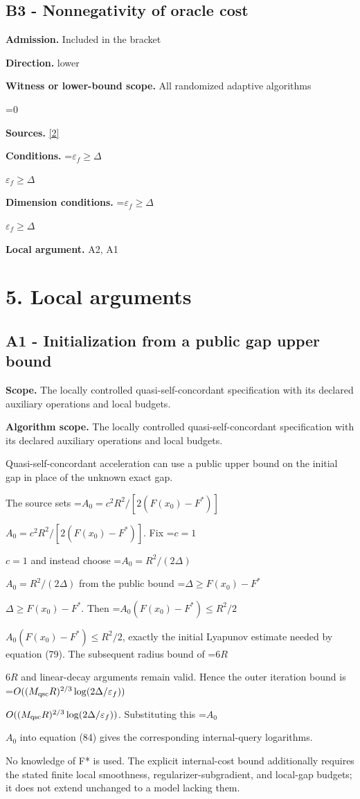 \documentclass[10pt,a4paper]{article}
\newcommand{\AtlasMath}[1]{\par\begingroup\centering\setbox0=\hbox{$\displaystyle #1$}\ifdim\wd0>1.4\linewidth\typeout{ATLAS WIDE FORMULA: \the\wd0}\fi\ifdim\wd0>\linewidth\resizebox{\linewidth}{!}{\box0}\else\box0\fi\par\endgroup}
\newcommand{\AtlasInlineMath}[1]{\begingroup\setbox0=\hbox{$#1$}\ifdim\wd0>.4\linewidth\endgroup\AtlasMath{#1}\else\endgroup$#1$\fi}
\begin{document}
\subsection{B3 - Nonnegativity of oracle cost}
\textbf{Admission.} Included in the bracket

\textbf{Direction.} lower

\textbf{Witness or lower-bound scope.} All randomized adaptive algorithms

\AtlasMath{0}
\textbf{Sources.} \href{https://arxiv.org/html/2610.00345v1}{[2]}

\textbf{Conditions.} \AtlasInlineMath{\varepsilon_f\ge\Delta}

\textbf{Dimension conditions.} \AtlasInlineMath{\varepsilon_f\ge\Delta}

\textbf{Local argument.} A2, A1

\section{5. Local arguments}
\subsection{A1 - Initialization from a public gap upper bound}
\textbf{Scope.} The locally controlled quasi-self-concordant specification with its declared auxiliary operations and local budgets.

\textbf{Algorithm scope.} The locally controlled quasi-self-concordant specification with its declared auxiliary operations and local budgets.

Quasi-self-concordant acceleration can use a public upper bound on the initial gap in place of the unknown exact gap.

The source sets \AtlasInlineMath{A_0=c^2R^2/[2(F(x_0)-F^*)]}. Fix \AtlasInlineMath{c=1} and instead choose \AtlasInlineMath{A_0=R^2/(2\Delta)} from the public bound \AtlasInlineMath{\Delta\ge F(x_0)-F^*}. Then \AtlasInlineMath{A_0(F(x_0)-F^*)\le R^2/2}, exactly the initial Lyapunov estimate needed by equation (79). The subsequent radius bound of \AtlasInlineMath{6R} and linear-decay arguments remain valid. Hence the outer iteration bound is \AtlasInlineMath{O((M_{\rm qsc}R)^{2/3}\log(2\Delta/\varepsilon_f))}. Substituting this \AtlasInlineMath{A_0} into equation (84) gives the corresponding internal-query logarithms.

No knowledge of F* is used. The explicit internal-cost bound additionally requires the stated finite local smoothness, regularizer-subgradient, and local-gap budgets; it does not extend unchanged to a model lacking them.
\end{document}
